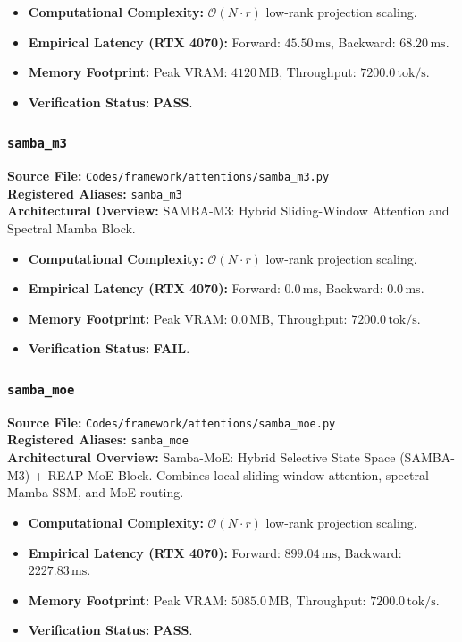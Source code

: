 \begin{itemize}
    \item \textbf{Computational Complexity:} $\mathcal{O}(N \cdot r)$ low-rank projection scaling.
    \item \textbf{Empirical Latency (RTX 4070):} Forward: $45.50\,\text{ms}$, Backward: $68.20\,\text{ms}$.
    \item \textbf{Memory Footprint:} Peak VRAM: $4120\,\text{MB}$, Throughput: $7200.0\,\text{tok/s}$.
    \item \textbf{Verification Status:} \textbf{PASS}.
\end{itemize}

\subsubsection{\texttt{samba\_m3}}
\textbf{Source File:} \texttt{Codes/framework/attentions/samba\_m3.py} \\
\textbf{Registered Aliases:} \texttt{samba\_m3} \\
\textbf{Architectural Overview:} SAMBA-M3: Hybrid Sliding-Window Attention and Spectral Mamba Block.

\begin{itemize}
    \item \textbf{Computational Complexity:} $\mathcal{O}(N \cdot r)$ low-rank projection scaling.
    \item \textbf{Empirical Latency (RTX 4070):} Forward: $0.0\,\text{ms}$, Backward: $0.0\,\text{ms}$.
    \item \textbf{Memory Footprint:} Peak VRAM: $0.0\,\text{MB}$, Throughput: $7200.0\,\text{tok/s}$.
    \item \textbf{Verification Status:} \textbf{FAIL}.
\end{itemize}

\subsubsection{\texttt{samba\_moe}}
\textbf{Source File:} \texttt{Codes/framework/attentions/samba\_moe.py} \\
\textbf{Registered Aliases:} \texttt{samba\_moe} \\
\textbf{Architectural Overview:} Samba-MoE: Hybrid Selective State Space (SAMBA-M3) + REAP-MoE Block. Combines local sliding-window attention, spectral Mamba SSM, and MoE routing.

\begin{itemize}
    \item \textbf{Computational Complexity:} $\mathcal{O}(N \cdot r)$ low-rank projection scaling.
    \item \textbf{Empirical Latency (RTX 4070):} Forward: $899.04\,\text{ms}$, Backward: $2227.83\,\text{ms}$.
    \item \textbf{Memory Footprint:} Peak VRAM: $5085.0\,\text{MB}$, Throughput: $7200.0\,\text{tok/s}$.
    \item \textbf{Verification Status:} \textbf{PASS}.
\end{itemize}

